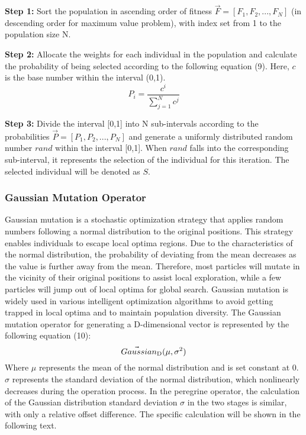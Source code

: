\documentclass[preprint,review,compress,12pt]{elsarticle}
\begin{document}
{\bf Step 1:} Sort the population in ascending order of fitness $\vec{F}=[F_1,F_2,...,F_N]$ (in descending order for maximum value problem), with index set from 1 to the population size N.

{\bf Step 2:} Allocate the weights for each individual in the population and calculate the probability of being selected according to the following equation (9). Here, $c$ is the base number within the interval (0,1).
\begin{equation}
    {P_i} = \frac{{{c^i}}}{{\sum\nolimits_{j = 1}^N {{c^j}} }}
\end{equation}

{\bf Step 3:} Divide the interval [0,1] into N sub-intervals according to the probabilities $\vec{P}=[P_1,P_2,...,P_N]$ and generate a uniformly distributed random number $rand$ within the interval [0,1]. When $rand$ falls into the corresponding sub-interval, it represents the selection of the individual for this iteration. The selected individual will be denoted as $S$.

\subsubsection{Gaussian Mutation Operator}
Gaussian mutation\cite{song2021dimension,zhou2022spiral} is a stochastic optimization strategy that applies random numbers following a normal distribution to the original positions. This strategy enables individuals to escape local optima regions. Due to the characteristics of the normal distribution, the probability of deviating from the mean decreases as the value is further away from the mean. Therefore, most particles will mutate in the vicinity of their original positions to assist local exploration, while a few particles will jump out of local optima for global search. Gaussian mutation is widely used in various intelligent optimization algorithms to avoid getting trapped in local optima and to maintain population diversity. The Gaussian mutation operator for generating a D-dimensional vector is represented by the following equation (10):
\begin{equation}
    \vec{Gaussia}{n_{\rm{D}}}(\mu ,{\sigma ^2})
\end{equation}
Where $\mu$ represents the mean of the normal distribution and is set constant at 0. $\sigma$ represents the standard deviation of the normal distribution, which nonlinearly decreases during the operation process. In the peregrine operator, the calculation of the Gaussian distribution standard deviation $\sigma$ in the two stages is similar, with only a relative offset difference. The specific calculation will be shown in the following text.
\end{document}
